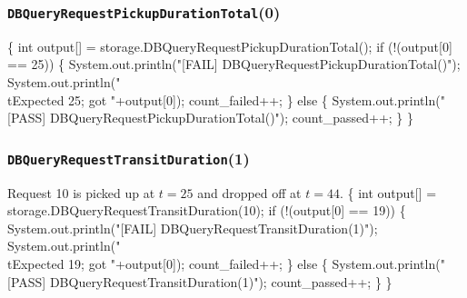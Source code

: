 \documentclass{article}
\def\nwendcode{\endtrivlist \endgroup}
\let\nwdocspar=\par
\begin{document}
\subsubsection{{\tt{}DBQueryRequestPickupDurationTotal}(0)}
\nwenddocs{}\endmoddef{}
\{
  int output[] = storage.DBQueryRequestPickupDurationTotal();
  if (!(output[0] == 25)) \{
    System.out.println("[FAIL] DBQueryRequestPickupDurationTotal()");
    System.out.println("\\tExpected 25; got "+output[0]);
    count_failed++;
  \} else \{
    System.out.println("[PASS] DBQueryRequestPickupDurationTotal()");
    count_passed++;
  \}
\}
\nwendcode{}\nwdocspar
\subsubsection{{\tt{}DBQueryRequestTransitDuration}(1)}
Request 10 is picked up at $t=25$ and dropped off at $t=44$.
\nwenddocs{}\endmoddef{}
\{
  int output[] = storage.DBQueryRequestTransitDuration(10);
  if (!(output[0] == 19)) \{
    System.out.println("[FAIL] DBQueryRequestTransitDuration(1)");
    System.out.println("\\tExpected 19; got "+output[0]);
    count_failed++;
  \} else \{
    System.out.println("[PASS] DBQueryRequestTransitDuration(1)");
    count_passed++;
  \}
\}
\nwendcode{}\nwdocspar
\end{document}
